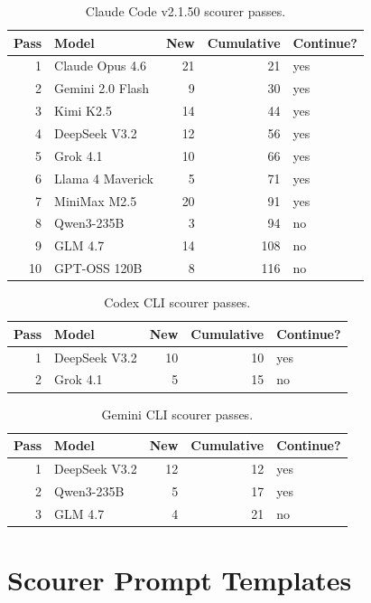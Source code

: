 \documentclass[11pt,a4paper]{article}
\begin{document}
\begin{table}[H]
\centering
\caption{Claude Code v2.1.50 scourer passes.}
\label{tab:convergence-claude}
\begin{tabular}{@{}rlrrl@{}}
\toprule
Pass & Model & New & Cumulative & Continue? \\
\midrule
1 & Claude Opus 4.6 & 21 & 21 & yes \\
2 & Gemini 2.0 Flash & 9 & 30 & yes \\
3 & Kimi K2.5 & 14 & 44 & yes \\
4 & DeepSeek V3.2 & 12 & 56 & yes \\
5 & Grok 4.1 & 10 & 66 & yes \\
6 & Llama 4 Maverick & 5 & 71 & yes \\
7 & MiniMax M2.5 & 20 & 91 & yes \\
8 & Qwen3-235B & 3 & 94 & no \\
9 & GLM 4.7 & 14 & 108 & no \\
10 & GPT-OSS 120B & 8 & 116 & no \\
\bottomrule
\end{tabular}
\end{table}

\begin{table}[H]
\centering
\caption{Codex CLI scourer passes.}
\begin{tabular}{@{}rlrrl@{}}
\toprule
Pass & Model & New & Cumulative & Continue? \\
\midrule
1 & DeepSeek V3.2 & 10 & 10 & yes \\
2 & Grok 4.1 & 5 & 15 & no \\
\bottomrule
\end{tabular}
\end{table}

\begin{table}[H]
\centering
\caption{Gemini CLI scourer passes.}
\begin{tabular}{@{}rlrrl@{}}
\toprule
Pass & Model & New & Cumulative & Continue? \\
\midrule
1 & DeepSeek V3.2 & 12 & 12 & yes \\
2 & Qwen3-235B & 5 & 17 & yes \\
3 & GLM 4.7 & 4 & 21 & no \\
\bottomrule
\end{tabular}
\end{table}


\section{Scourer Prompt Templates}
\label{app:prompts}
\end{document}
